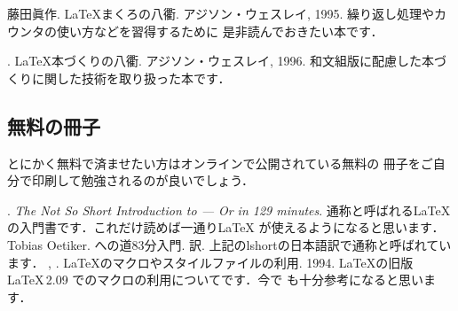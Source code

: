 \begin{myreferences}

  藤田眞作.  \newblock
  {\LaTeX}まくろの八衢. 
  アジソン・ウェスレイ, 1995. 
  \sanko
  繰り返し処理やカウンタの使い方などを習得するために
  是非読んでおきたい本です．
 
  \iiiemdash.  \newblock
  {\LaTeX}本づくりの八衢. 
  アジソン・ウェスレイ, 1996. 
  \sanko
  和文組版に配慮した本づくりに関した技術を取り扱った本です．

\end{myreferences}


\subsection{無料の冊子}
とにかく無料で済ませたい方はオンラインで公開されている無料の
冊子をご自分で印刷して勉強されるのが良いでしょう．
%
\begin{myreferences}
 . \newblock
  \emph{The Not So Short Introduction to {\LaTeXe}---%
    Or {\LaTeXe} in 129 minutes}.
  \sanko {}
  \sanko
 通称と呼ばれる{\LaTeX}の入門書です．これだけ読めば一通り{\LaTeX}
 が使えるようになると思います．
%
  Tobias Oetiker.  \newblock
  {\LaTeXe}への道\zdash 83分{\LaTeXe}入門. 訳.
  \sanko {} 
  \sanko 上記のlshortの日本語訳で通称と呼ばれています．
%
  , .   \newblock
  {\LaTeX}のマクロやスタイルファイルの利用.   1994.
  \sanko \webBear
  \sanko \LaTeX の旧版 \LaTeX\,2.09 でのマクロの利用についてです．今で
  も十分参考になると思います．

\end{myreferences}
%

